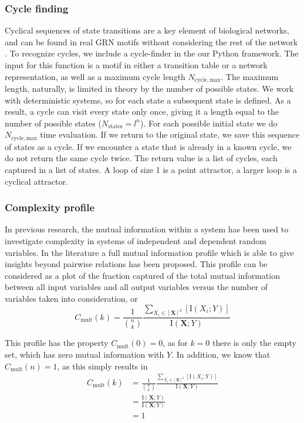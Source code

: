\documentclass[../main.tex]{subfiles}
\begin{document}
\subsubsection{Cycle finding}

Cyclical sequences of state transitions are a key element of biological networks, and can be found in real GRN motifs without considering the rest of the network \cite{burda2011motifs}.
To recognize cycles, we include a cycle-finder in the our Python framework.
The input for this function is a motif in either a transition table or a network representation, as well as a maximum cycle length $N_\mathrm{cycle,max}$.
The maximum length, naturally, is limited in theory by the number of possible states.
We work with deterministic systems, so for each state a subsequent state is defined.
As a result, a cycle can visit every state only once, giving it a length equal to the number of possible states ($N_\mathrm{states} = l^n$).
For each possible initial state we do $N_\mathrm{cycle,max}$ time evaluation.
If we return to the original state, we save this sequence of states as a cycle.
If we encounter a state that is already in a known cycle, we do not return the same cycle twice.
The return value is a list of cycles, each captured in a list of states.
A loop of size 1 is a point attractor, a larger loop is a cyclical attractor.

\subsubsection{Complexity profile}

In previous research, the mutual information within a system has been used to investigate complexity in systems of independent and dependent random variables.
In the literature a full mutual information profile which is able to give insights beyond pairwise relations has been proposed.
This profile can be considered as a plot of the fraction captured of the total mutual information between all input variables and all output variables versus the number of variables taken into consideration, or
%
\begin{equation}
C_\mathrm{mult}(k) = \frac{1}{\binom{n}{k}}\frac{\sum_{X_i \in [\mathbf{X}]^k} [\mathrm{I}\left( X_i;Y \right)]}{\mathrm{I}\left( \mathbf{X};Y\right)}
\end{equation}

This profile has the property $C_\mathrm{mult}\left( 0 \right) = 0$, as for $k = 0$ there is only the empty set, which has zero mutual information with $Y$.
In addition, we know that $C_\mathrm{mult}\left( n\right) = 1$, as this simply results in
%
\begin{align}
C_\mathrm{mult}\left( k \right) 
&= \frac{1}{\binom{n}{k}}\frac{\sum_{X_i \in [\mathbf{X}]^k} [\mathrm{I}\left( X_i;Y\right)]}{\mathrm{I}\left( \mathbf{X};Y\right)} \\
&= \frac{\mathrm{I}\left( \mathbf{X};Y\right)}{\mathrm{I}\left( \mathbf{X};Y\right)} \\
&= 1
\end{align}
\end{document}
